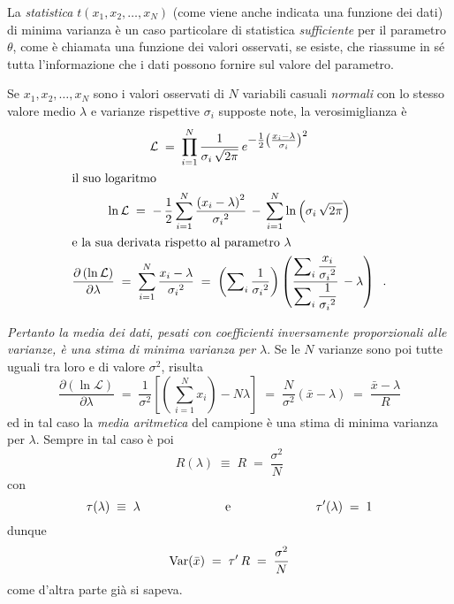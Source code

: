 La \emph{statistica} $t(x_1,x_2,\ldots,x_N)$ (come viene
anche indicata una funzione dei dati) di minima varianza \`e
un caso particolare di statistica \emph{sufficiente} per il
parametro $\theta$, come \`e chiamata una funzione dei
valori osservati, se esiste, che riassume in s\'e tutta
l'informazione che i dati possono fornire sul valore del
parametro.

%
Se $x_1,x_2,\ldots,x_N$ sono i valori osservati di $N$
variabili casuali \emph{normali} con lo stesso valore medio
$\lambda$ e varianze rispettive $\sigma_i$ supposte note, la
verosimiglianza \`e
\begin{gather*}
  \mathcal{L} \; = \; \prod_{i=1}^N \frac{1}
    {\sigma_i \, \sqrt{2 \pi}} \,
    e^{\textstyle -\frac{1}{2} \bigl(
    \frac{x_i - \lambda}{\sigma_i}
     \bigr) ^2 } \\
  \intertext{il suo logaritmo}
  \ln \mathcal{L} \; = \; - \,
    \frac{1}{2} \sum_{i=1}^N
    \frac{\left( x_i - \lambda \right) ^2}
    { {\sigma_i}^2 } \, - \,
    \sum_{i=1}^N \ln \left(
    \sigma_i \, \sqrt{2 \pi} \right) \\
  \intertext{e la sua derivata rispetto al
    parametro $\lambda$}
  \frac{\partial \left( \ln \mathcal{L} \right)}
    {\partial \lambda} \; = \;
    \sum_{i=1}^N \frac{x_i - \lambda}
    { {\sigma_i}^2 } \; = \;
    \left( \sum \nolimits_i \frac{1}
    { {\sigma_i}^2 } \right)
    \left( \frac{\displaystyle \sum\nolimits_i
    \frac{x_i} { {\sigma_i}^2 } }
    { \displaystyle \sum\nolimits_i \frac{1}{
    {\sigma_i}^2 } } \, - \lambda \right) \;\; .
\end{gather*}

\emph{Pertanto la media dei dati, pesati con coefficienti
  inversamente proporzionali alle varianze, \`e una stima di
  minima varianza per $\lambda$}.  Se le $N$ varianze sono
poi tutte uguali tra loro e di valore $\sigma^2$, risulta
\begin{equation*}
  \frac{\partial \left( \ln \mathcal{L} \right)}
    {\partial \lambda} \; = \;
    \frac{1}{\sigma^2} \left[ \left( \,
    \sum_{i=1}^N x_i \right) -
    N \lambda \right] \; = \;
    \frac{N}{\sigma^2} \left( \bar x - \lambda \right) \; = \;
    \frac{\bar x - \lambda}{R}
\end{equation*}
ed in tal caso la \emph{media aritmetica} del campione \`e
una stima di minima varianza per $\lambda$.  Sempre in tal
caso \`e poi
\begin{equation*}
  R(\lambda) \; \equiv \; R \; = \;
    \frac{\sigma^2}{N}
\end{equation*}
con
\begin{equation*}
  \tau(\lambda) \; \equiv \; \lambda
    \makebox[50mm]{e}
   \tau'(\lambda) \; = \; 1
\end{equation*}
dunque
\begin{equation*}
  \operatorname{Var} (\bar x) \; = \; \tau ' \, R \; = \;
    \frac{\sigma^2}{N}
\end{equation*}
come d'altra parte gi\`a si sapeva.

